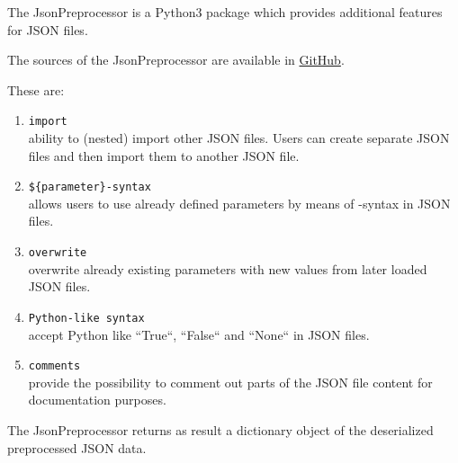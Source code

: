 %



%

The JsonPreprocessor is a Python3 package which provides additional features for
JSON files.

The sources of the JsonPreprocessor are available in \href{https://github.com/test-fullautomation/python-jsonpreprocessor}{GitHub}.

These are:
\begin{enumerate}
\item \texttt{import}\\
   ability to (nested) import other JSON files. Users can create separate JSON files and then import 
   them to another JSON file.
\item \texttt{\$\{parameter\}-syntax}\\
   allows users to use already defined parameters by means of -syntax in JSON files.
\item \texttt{overwrite}\\
   overwrite already existing parameters with new values from later loaded JSON files.
\item \texttt{Python-like syntax}\\
   accept Python like ``True``, ``False`` and ``None`` in JSON files. 
\item \texttt{comments}\\
  provide the possibility to comment out parts of the JSON file content for documentation purposes.
\end{enumerate}

The JsonPreprocessor returns as result a dictionary object of the deserialized 
preprocessed JSON data.



